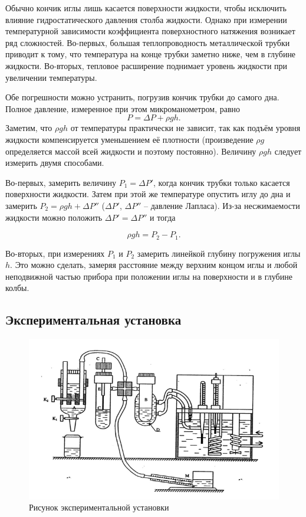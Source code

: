 \documentclass[12pt,a4paper]{article}
\begin{document}
Обычно кончик иглы лишь касается поверхности жидкости, чтобы исключить влияние гидростатического давления столба жидкости. Однако при измерении температурной зависимости коэффициента поверхностного натяжения возникает ряд сложностей. Во-первых, большая теплопроводность металлической трубки приводит к тому, что температура на конце трубки заметно ниже, чем в глубине жидкости. Во-вторых, тепловое расширение поднимает уровень жидкости при увеличении температуры.

Обе погрешности можно устранить, погрузив кончик трубки до самого дна. Полное давление, измеренное при этом микроманометром, равно \[ P = \Delta P + \rho g h.\] Заметим, что $ \rho gh $ от температуры практически не зависит, так как подъём уровня жидкости компенсируется уменьшением её плотности (произведение $ \rho g $ определяется массой всей жидкости и поэтому постоянно). Величину  $ \rho g h $ следует измерить двумя способами.

Во-первых, замерить величину $ P_1= \Delta P' $, когда кончик трубки только касается поверхности жидкости. Затем при этой же температуре опустить иглу до дна и замерить $ P_2= \rho gh + \Delta P'' $ ($ \Delta P' $, $ \Delta P'' $ -- давление Лапласа). Из-за  несжимаемости  жидкости можно положить $ \Delta P' = \Delta P'' $ и тогда 

\begin{equation}
 \rho gh= P_2 - P_1. 
\end{equation}
 
Во-вторых, при измерениях $ P_1 $ и $ P_2 $ замерить линейкой  глубину погружения иглы $ h $. Это можно сделать, замеряя расстояние между верхним концом иглы и любой неподвижной частью прибора при положении иглы на поверхности и в глубине колбы.

\subsection{Экспериментальная установка}

\begin{figure}[H]
	\begin{center}
		\includegraphics[width=15cm]{2.5.1_1}
		\caption{Рисунок экспериментальной установки}\label{img:ust}
	\end{center}
\end{figure}
\end{document}
